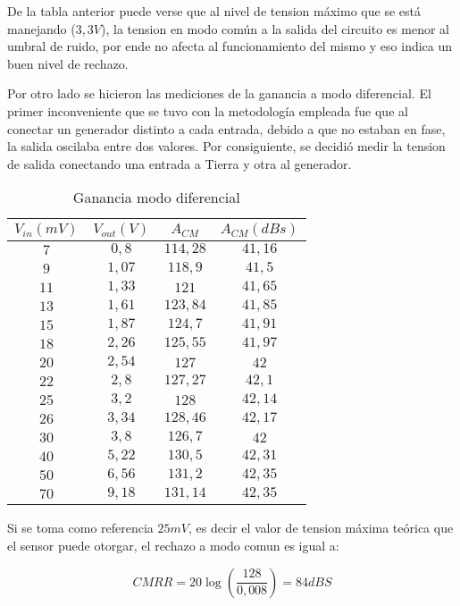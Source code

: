 De la tabla anterior puede verse que al nivel de tension m\'aximo que se est\'a manejando ($3,3V$), la tension en modo com\'un a la salida del circuito es menor al umbral de ruido, por ende no afecta al funcionamiento del mismo y eso indica un buen nivel de rechazo.


Por otro lado se hicieron las mediciones de la ganancia a modo diferencial. El primer inconveniente que se tuvo con la metodolog\'ia empleada fue que al conectar un generador distinto a cada entrada, debido a que no estaban en fase, la salida oscilaba entre dos valores. Por consiguiente, se decidi\'o medir la tension de salida conectando una entrada a Tierra y otra al generador. 

\begin{table}[H]
\centering
\begin{tabular}{cccc}\hline
$V_{in}(mV)$ & $V_{out}(V)$ & $A_{CM}$ & $A_{CM} (dBs)$ \\
\hline
$7$   & $0,8$  & $114,28$ & $41,16$ \\
$9$  & $1,07$ & $118,9$ & $41,5$\\
$11$  & $1,33$ & $121$ & $41,65$\\
$13$  & $1,61$ & $123,84$ & $41,85$\\
$15$  & $1,87$ & $124,7$ & $41,91$\\
$18$  & $2,26$ & $125,55$ & $41,97$\\
$20$  & $2,54$ & $127$ & $42$\\
$22$  & $2,8$ & $127,27$ & $42,1$\\
$25$  & $3,2$ & $128$ & $42,14$\\
$26$  & $3,34$ & $128,46$ & $42,17$\\
$30$  & $3,8$ & $126,7$ & $42$\\
$40$  & $5,22$ & $130,5$ & $42,31$\\
$50$  & $6,56$ & $131,2$ & $42,35$\\
$70$  & $9,18$ & $131,14$ & $42,35$\\ \hline
\end{tabular}
\caption{Ganancia modo diferencial}
\label{table:ganancia_diferencial}
\end{table}

Si se toma como referencia $25mV$, es decir el valor de tension m\'axima te\'orica que el sensor puede otorgar, el rechazo a modo comun es igual a:

\begin{equation}
CMRR = 20\log(\frac{128}{0,008}) = \boxed{84 dBS}
\end{equation}

